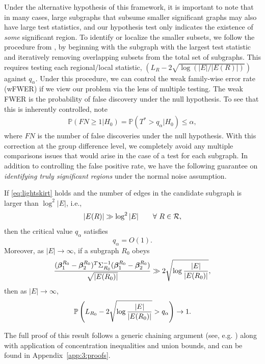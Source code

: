 Under the alternative hypothesis of this framework, it is important to note that in many cases,
large subgraphs that subsume smaller significant graphs may also have large test statistics, and our hypothesis test only indicates the existence of {\em some} significant region. To identify or localize the smaller subsets, we follow the procedure from \cite{jeng2010optimal}, by beginning with the subgraph with the largest test statistic and iteratively removing overlapping subsets from the total set of subgraphs. This requires testing each regional/local statistic, $(L_R - 2\sqrt{\log(|E|/|E(R)|)})$ against $q_\alpha$. Under this procedure, we can control the weak family-wise error rate (wFWER) if we view our problem via the lens of multiple testing. The weak FWER is the probability of false discovery under the null hypothesis. To see that this is inherently controlled, note
\begin{align}
\mathbb{P}(FN \geq 1|H_0) = \mathbb{P}(T^* > q_\alpha|H_0) \leq \alpha, 
\end{align}
where $FN$ is the number of false discoveries under the null hypothesis. With this correction at the group difference level, we completely avoid any multiple comparisons issues that would arise in the case of a test for each subgraph.
%
In addition to controlling the false positive rate, we have the following guarantee on {\em identifying truly significant regions} under the normal noise assumption.
\begin{theorem}
If \eqref{eq:lightskirt} holds and the number of edges in the candidate subgraph is larger than $\log^2 |E|$, i.e.,
\begin{equation}
\label{eq:setsize}
|E(R)|\gg \log^2 |E|\qquad \forall\ R\in\mathcal{R},
\end{equation}
then the critical value $q_\alpha$ satisfies
\begin{equation}
\label{eq:criticalvl}
q_\alpha=O(1).
\end{equation}
Moreover, as $|E|\to \infty$, if a subgraph $R_0$ obeys 
\begin{equation}
\label{eq:sigcond}
\frac{(\bm{\beta}_1^{R_0}-\bm{\beta}_2^{R_0})^T\Sigma_{R_0}^{-1}(\bm{\beta}_1^{R_0}-\bm{\beta}_2^{R_0})}{\sqrt{|E({R_0})|}}\gg 2\sqrt{\log\frac{|E|}{|E({R_0})|}},
\end{equation}
then as $|E|\to \infty$,
\begin{equation}
\label{eq:power}
\mathbb{P}\left(L_{R_0}-2\sqrt{\log\frac{|E|}{|E({R_0})|}}>q_\alpha\right)\to 1.
\end{equation}
\label{lm:mainthm}
\end{theorem}
The full proof of this result follows a generic chaining argument (see, e.g. \cite{talagrand2006generic}) along with application of 
concentration inequalities and union bounds, and can be found in Appendix~\ref{app:3:proofs}.


